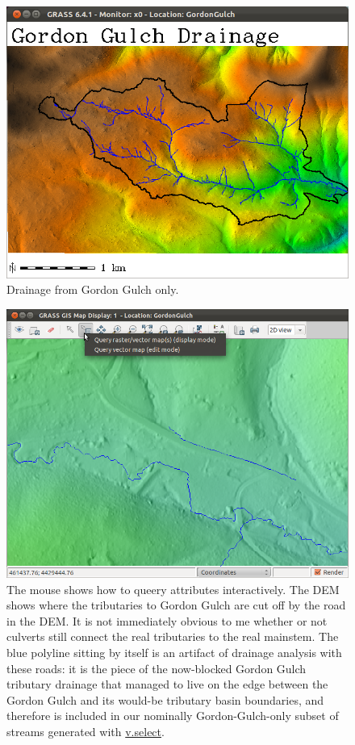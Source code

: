 \documentclass{book}
\begin{document}
\begin{figure}[h]
 \begin{center}
 \includegraphics[width=.9\linewidth]{figures/ubuntu/GGdrainage.png}
 \caption{Drainage from Gordon Gulch only.}
 \label{fig:GGdrainage}
 \end{center}
\end{figure}

\begin{figure}[h]
 \begin{center}
 \includegraphics[width=.9\linewidth]{figures/ubuntu/GUIqueery.png}
 \caption{The mouse shows how to queery attributes interactively. The DEM shows where the tributaries to Gordon Gulch are cut off by the road in the DEM. It is not immediately obvious to me whether or not culverts still connect the real tributaries to the real mainstem. The blue polyline sitting by itself is an artifact of drainage analysis with these roads: it is the piece of the now-blocked Gordon Gulch tributary drainage that managed to live on the edge between the Gordon Gulch and its would-be tributary basin boundaries, and therefore is included in our nominally Gordon-Gulch-only subset of streams generated with \protect\url{v.select}.}
 \label{fig:GUIqueery}
 \end{center}
\end{figure}
\end{document}
